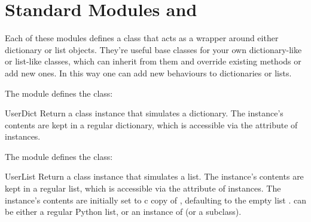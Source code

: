 \section{Standard Modules  and }
Each of these modules defines a class that acts as a wrapper around
either dictionary or list objects.  They're useful base classes for
your own dictionary-like or list-like classes, which can inherit from
them and override existing methods or add new ones.  In this way one
can add new behaviours to dictionaries or lists.

\renewcommand{\indexsubitem}{(in module UserDict)}
The  module defines the  class:

\begin{funcdesc}{UserDict}{}
Return a class instance that simulates a dictionary.  The instance's
contents are kept in a regular dictionary, which is accessible via the
 attribute of  instances.
\end{funcdesc}

\renewcommand{\indexsubitem}{(in module UserList)}
The  module defines the  class:

\begin{funcdesc}{UserList}{}
Return a class instance that simulates a list.  The instance's
contents are kept in a regular list, which is accessible via the
 attribute of  instances.  The instance's
contents are initially set to c copy of , defaulting to the
empty list \code{[]}.   can be either a regular Python list,
or an instance of  (or a subclass).
\end{funcdesc}
